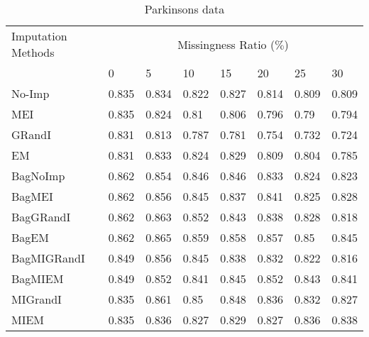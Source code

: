 \documentclass{iosart2c}
\begin{document}
\begin{table*}[htb]
\centering
\caption{Parkinsons data}
\label{tab:parkinson}
    \begin{tabular}{|p{25mm}|l|l|l|l|l|l|l|} \hline
     Imputation Methods    & \multicolumn{7}{c|}{Missingness Ratio ($\%$)} \\ \cline{2-8}
                           &  0 & 5 & 10 & 15 & 20 & 25 & 30 \\ \hline
No-Imp & 0.835 & 0.834 & 0.822 & 0.827 & 0.814 & 0.809 & 0.809 \\ \hline
MEI & 0.835 & 0.824 & 0.81 & 0.806 & 0.796 & 0.79 & 0.794 \\ \hline
GRandI & 0.831 & 0.813 & 0.787 & 0.781 & 0.754 & 0.732 & 0.724 \\ \hline
EM & 0.831 & 0.833 & 0.824 & 0.829 & 0.809 & 0.804 & 0.785 \\ \hline \hline
BagNoImp & 0.862 & 0.854 & 0.846 & 0.846 & 0.833 & 0.824 & 0.823 \\ \hline
BagMEI & 0.862 & 0.856 & 0.845 & 0.837 & 0.841 & 0.825 & 0.828 \\ \hline
BagGRandI & 0.862 & 0.863 & 0.852 & 0.843 & 0.838 & 0.828 & 0.818 \\ \hline
BagEM & 0.862 & 0.865 & 0.859 & 0.858 & 0.857 & 0.85 & 0.845 \\ \hline \hline
BagMIGRandI & 0.849 & 0.856 & 0.845 & 0.838 & 0.832 & 0.822 & 0.816 \\ \hline
BagMIEM & 0.849 & 0.852 & 0.841 & 0.845 & 0.852 & 0.843 & 0.841 \\ \hline \hline
MIGrandI & 0.835 & 0.861 & 0.85 & 0.848 & 0.836 & 0.832 & 0.827 \\ \hline
MIEM & 0.835 & 0.836 & 0.827 & 0.829 & 0.827 & 0.836 & 0.838 \\ \hline
\end{tabular}
\end{table*}
\end{document}
